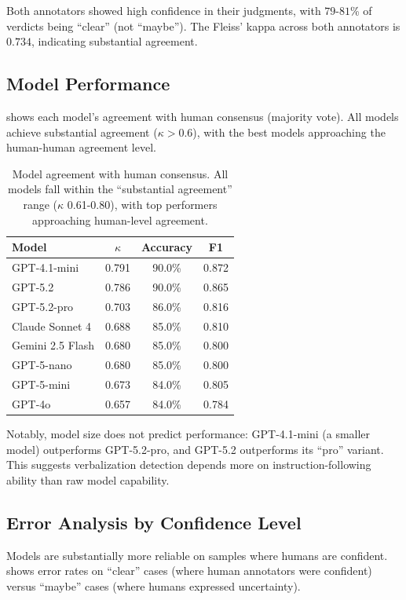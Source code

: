 Both annotators showed high confidence in their judgments, with $79$-$81$\% of verdicts being ``clear'' (not ``maybe''). The Fleiss' kappa across both annotators is $0.734$, indicating substantial agreement.

\subsection{Model Performance}

 shows each model's agreement with human consensus (majority vote). All models achieve substantial agreement ($\kappa > 0.6$), with the best models approaching the human-human agreement level.

\begin{table}[h]
\centering
\caption{Model agreement with human consensus. All models fall within the ``substantial agreement'' range ($\kappa$ 0.61-0.80), with top performers approaching human-level agreement.}
\label{tab:model-vs-consensus}
\begin{tabular}{lccc}
\toprule
Model & $\kappa$ & Accuracy & F1 \\
\midrule
GPT-4.1-mini & 0.791 & 90.0\% & 0.872 \\
GPT-5.2 & 0.786 & 90.0\% & 0.865 \\
GPT-5.2-pro & 0.703 & 86.0\% & 0.816 \\
Claude Sonnet 4 & 0.688 & 85.0\% & 0.810 \\
Gemini 2.5 Flash & 0.680 & 85.0\% & 0.800 \\
GPT-5-nano & 0.680 & 85.0\% & 0.800 \\
GPT-5-mini & 0.673 & 84.0\% & 0.805 \\
GPT-4o & 0.657 & 84.0\% & 0.784 \\
\bottomrule
\end{tabular}
\end{table}

Notably, model size does not predict performance: GPT-4.1-mini (a smaller model) outperforms GPT-5.2-pro, and GPT-5.2 outperforms its ``pro'' variant. This suggests verbalization detection depends more on instruction-following ability than raw model capability.

\subsection{Error Analysis by Confidence Level}

Models are substantially more reliable on samples where humans are confident.  shows error rates on ``clear'' cases (where human annotators were confident) versus ``maybe'' cases (where humans expressed uncertainty).


